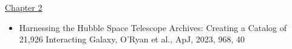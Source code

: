 


\begin{pubs}        %
\newif\ifshowcitations\showcitationsfalse%
\newif\ifshowlinks\showlinksfalse%

%
%
%

\ifshowlinks%
  \usepackage[
         colorlinks=true,
         urlcolor=blue,       %
         ]{hyperref}
  \newcommand*{\inspireurl}[1]{\\\href{#1}{INSPIRE-HEP entry}}
\else
  \makeatletter
  \newcommand*{\inspireurl}[1]{\@bsphack\@esphack}
  \makeatother
\fi
\ifshowcitations%
  \newcommand*{\citations}[1]{\\* #1}
\else
  \makeatletter
  \newcommand*{\citations}[1]{\@bsphack\@esphack}
  \makeatother
\fi
\renewcommand{\labelenumii}{\arabic{enumi}.\arabic{enumii}}


%
\underline{Chapter 2}
\begin{itemize}
	\item Harnessing the Hubble Space Telescope Archives: Creating a Catalog of 21,926 Interacting Galaxy, O'Ryan et al., ApJ, 2023, 968, 40
\end{itemize}


\end{pubs}
